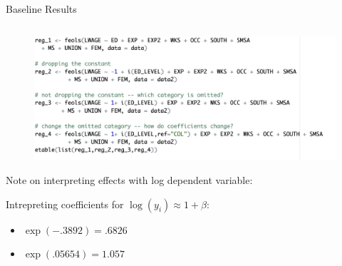 \begin{frame}{Baseline Results}
\begin{columns}
\begin{column}{0.6\textwidth}
\begin{figure}
\flushleft
	\includegraphics [width=\textwidth]	{code_1}
\end{figure}
Note on interpreting effects with log dependent variable:

Intrepreting coefficients for $\log(y_i)\approx 1+\beta$:
\begin{itemize}
	\item $\exp \left( -.3892\right) = .6826$
		\item $\exp \left( .05654\right) = 1.057$
\end{itemize}


\end{column}
\end{columns}
\end{frame}
